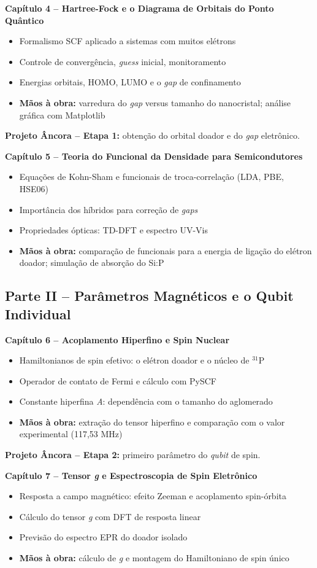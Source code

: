 \documentclass[12pt,a4paper]{article}
\begin{document}
	\textbf{Capítulo 4 -- Hartree-Fock e o Diagrama de Orbitais do Ponto Quântico}
	\begin{itemize}
		\item Formalismo SCF aplicado a sistemas com muitos elétrons
		\item Controle de convergência, \emph{guess} inicial, monitoramento
		\item Energias orbitais, HOMO, LUMO e o \emph{gap} de confinamento
		\item \textbf{Mãos à obra:} varredura do \emph{gap} versus tamanho do nanocristal; análise gráfica com Matplotlib
	\end{itemize}
	\textbf{Projeto Âncora -- Etapa 1:} obtenção do orbital doador e do \emph{gap} eletrônico.
	
	\textbf{Capítulo 5 -- Teoria do Funcional da Densidade para Semicondutores}
	\begin{itemize}
		\item Equações de Kohn-Sham e funcionais de troca-correlação (LDA, PBE, HSE06)
		\item Importância dos híbridos para correção de \emph{gaps}
		\item Propriedades ópticas: TD-DFT e espectro UV-Vis
		\item \textbf{Mãos à obra:} comparação de funcionais para a energia de ligação do elétron doador; simulação de absorção do Si:P
	\end{itemize}
	
	\subsection*{Parte II -- Parâmetros Magnéticos e o Qubit Individual}
	
	\textbf{Capítulo 6 -- Acoplamento Hiperfino e Spin Nuclear}
	\begin{itemize}
		\item Hamiltonianos de spin efetivo: o elétron doador e o núcleo de $^{31}$P
		\item Operador de contato de Fermi e cálculo com PySCF
		\item Constante hiperfina \emph{A}: dependência com o tamanho do aglomerado
		\item \textbf{Mãos à obra:} extração do tensor hiperfino e comparação com o valor experimental (117,53 MHz)
	\end{itemize}
	\textbf{Projeto Âncora -- Etapa 2:} primeiro parâmetro do \emph{qubit} de spin.
	
	\textbf{Capítulo 7 -- Tensor \emph{g} e Espectroscopia de Spin Eletrônico}
	\begin{itemize}
		\item Resposta a campo magnético: efeito Zeeman e acoplamento spin-órbita
		\item Cálculo do tensor \emph{g} com DFT de resposta linear
		\item Previsão do espectro EPR do doador isolado
		\item \textbf{Mãos à obra:} cálculo de \emph{g} e montagem do Hamiltoniano de spin único
	\end{itemize}
	
\end{document}
